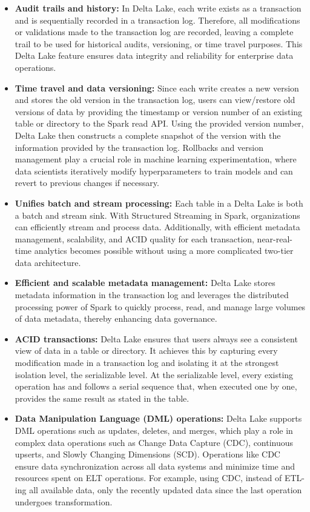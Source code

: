 \begin{itemize}
\item[\textbullet] \textbf{Audit trails and history:} In Delta Lake, each write exists as a transaction and is sequentially recorded in a transaction log. Therefore, all modifications or validations made to the transaction log are recorded, leaving a complete trail to be used for historical audits, versioning, or time travel purposes. This Delta Lake feature ensures data integrity and reliability for enterprise data operations.
\item[\textbullet] \textbf{Time travel and data versioning:} Since each write creates a new version and stores the old version in the transaction log, users can view/restore old versions of data by providing the timestamp or version number of an existing table or directory to the Spark read API. Using the provided version number, Delta Lake then constructs a complete snapshot of the version with the information provided by the transaction log. Rollbacks and version management play a crucial role in machine learning experimentation, where data scientists iteratively modify hyperparameters to train models and can revert to previous changes if necessary.
\item[\textbullet] \textbf{Unifies batch and stream processing:} Each table in a Delta Lake is both a batch and stream sink. With Structured Streaming in Spark, organizations can efficiently stream and process data. Additionally, with efficient metadata management, scalability, and ACID quality for each transaction, near-real-time analytics becomes possible without using a more complicated two-tier data architecture.
\item[\textbullet] \textbf{Efficient and scalable metadata management:} Delta Lake stores metadata information in the transaction log and leverages the distributed processing power of Spark to quickly process, read, and manage large volumes of data metadata, thereby enhancing data governance.
\item[\textbullet] \textbf{ACID transactions:} Delta Lake ensures that users always see a consistent view of data in a table or directory. It achieves this by capturing every modification made in a transaction log and isolating it at the strongest isolation level, the serializable level. At the serializable level, every existing operation has and follows a serial sequence that, when executed one by one, provides the same result as stated in the table.
\item[\textbullet] \textbf{Data Manipulation Language (DML) operations:} Delta Lake supports DML operations such as updates, deletes, and merges, which play a role in complex data operations such as Change Data Capture (CDC), continuous upserts, and Slowly Changing Dimensions (SCD). Operations like CDC ensure data synchronization across all data systems and minimize time and resources spent on ELT operations. For example, using CDC, instead of ETL-ing all available data, only the recently updated data since the last operation undergoes transformation.

\end{itemize}
